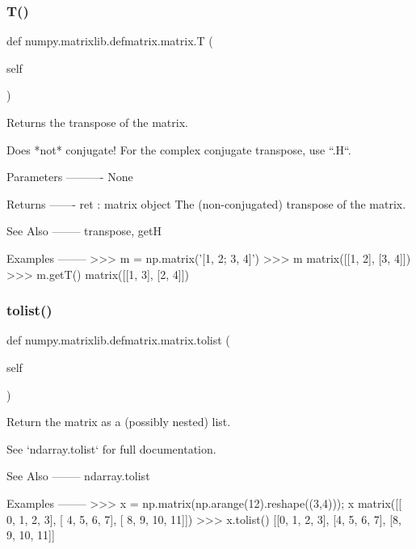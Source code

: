\subsubsection{\texorpdfstring{T()}{T()}}
{\footnotesize\ttfamily def numpy.\+matrixlib.\+defmatrix.\+matrix.\+T (\begin{DoxyParamCaption}\item[{}]{self }\end{DoxyParamCaption})}

\begin{DoxyVerb}Returns the transpose of the matrix.

Does *not* conjugate!  For the complex conjugate transpose, use ``.H``.

Parameters
----------
None

Returns
-------
ret : matrix object
    The (non-conjugated) transpose of the matrix.

See Also
--------
transpose, getH

Examples
--------
>>> m = np.matrix('[1, 2; 3, 4]')
>>> m
matrix([[1, 2],
[3, 4]])
>>> m.getT()
matrix([[1, 3],
[2, 4]])\end{DoxyVerb}
 \mbox{\label{classnumpy_1_1matrixlib_1_1defmatrix_1_1matrix_a0b029ac8531e8e8f8ceaf8e4ec80d53d}} 
\subsubsection{\texorpdfstring{tolist()}{tolist()}}
{\footnotesize\ttfamily def numpy.\+matrixlib.\+defmatrix.\+matrix.\+tolist (\begin{DoxyParamCaption}\item[{}]{self }\end{DoxyParamCaption})}

\begin{DoxyVerb}Return the matrix as a (possibly nested) list.

See `ndarray.tolist` for full documentation.

See Also
--------
ndarray.tolist

Examples
--------
>>> x = np.matrix(np.arange(12).reshape((3,4))); x
matrix([[ 0,  1,  2,  3],
[ 4,  5,  6,  7],
[ 8,  9, 10, 11]])
>>> x.tolist()
[[0, 1, 2, 3], [4, 5, 6, 7], [8, 9, 10, 11]]\end{DoxyVerb}
 \mbox{\label{classnumpy_1_1matrixlib_1_1defmatrix_1_1matrix_a6277398ac4c8b97fb15dc9299d1c8cec}} 
